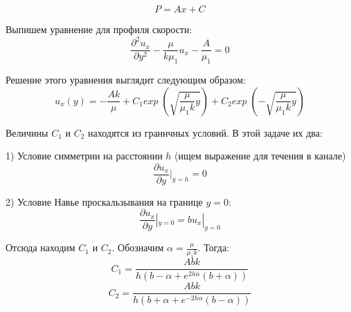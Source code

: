 $$P=Ax+C$$
\par Выпишем уравнение для профиля скорости:
$$\frac{\partial^{2} u_{x}}{\partial y^{2}}-\frac{\mu}{k\mu_{1}}u_{x}-\frac{A}{\mu_{1}}=0$$
\par Решение этого уравнения выглядит следующим образом:
$$u_{x}(y)=-\frac{Ak}{\mu}+C_{1}exp\;(\sqrt{\frac{\mu}{\mu_{1}k}y})+C_{2}exp\;(-\sqrt{\frac{\mu}{\mu_{1}k}y})$$
\par Величины $C_{1}$ и $C_{2}$ находятся из граничных условий. В этой задаче их два:\\
\par 1) Условие симметрии на расстоянии $h$ (ищем выражение для течения в канале)
$$\frac{\partial u_{x}}{\partial y}|_{y=h}=0$$
\par 2) Условие Навье проскальзывания на границе $y=0$: 
$$\frac{\partial u_{x}}{\partial y}|_{y=0}=bu_{x}|_{y=0}$$
\par Отсюда находим $C_{1}$ и $C_{2}$. Обозначим $\alpha=\frac{\mu}{\mu_{1}k}$. Тогда:
$$C_{1}=\frac{Abk}{h(b-\alpha+e^{2h\alpha}(b+\alpha))}$$
$$C_{2}=\frac{Abk}{h(b+\alpha+e^{-2h\alpha}(b-\alpha))}$$
\par [Построить графики с характерными параметрами, (b~0.1h)]
